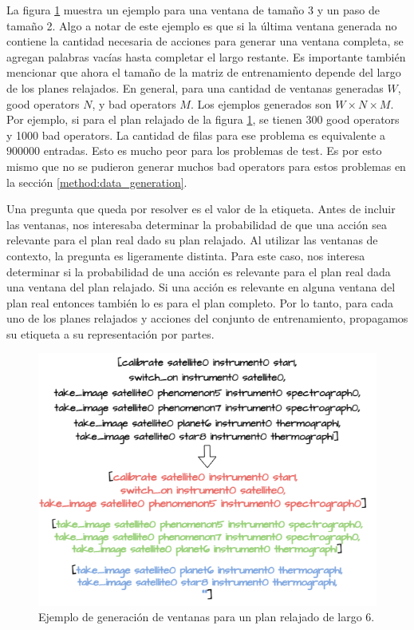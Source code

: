 La figura \ref{fig:window_example} muestra un ejemplo para una ventana de tamaño
3 y un paso de tamaño 2. Algo a notar de este ejemplo es que si la última
ventana generada no contiene la cantidad necesaria de acciones para generar una
ventana completa, se agregan palabras vacías hasta completar el largo restante.
Es importante también mencionar que ahora el tamaño de la matriz de entrenamiento
depende del largo de los planes relajados. En general, para una cantidad de
ventanas generadas $W$, good operators $N$, y bad operators $M$. Los ejemplos
generados son $W \times N \times M$. Por ejemplo, si para el plan relajado de la
figura \ref{fig:window_example}, se tienen 300 good operators y 1000 bad
operators. La cantidad de filas para ese problema es equivalente a $900000$
entradas. Esto es mucho peor para los problemas de test. Es por esto mismo que
no se pudieron generar muchos bad operators para estos problemas en la sección
\ref{method:data_generation}.

Una pregunta que queda por resolver es el valor de la etiqueta. Antes de incluir
las ventanas, nos interesaba determinar la probabilidad de que una acción sea
relevante para el plan real dado su plan relajado. Al utilizar las ventanas de
contexto, la pregunta es ligeramente distinta. Para este caso, nos interesa
determinar si la probabilidad de una acción es relevante para el plan real dada
una ventana del plan relajado. Si una acción es relevante en alguna ventana del
plan real entonces también lo es para el plan completo. Por lo tanto, para cada
uno de los planes relajados y acciones del conjunto de entrenamiento, propagamos
su etiqueta a su representación por partes.

\begin{figure}[t!]
    \centering
    \includegraphics[width=\linewidth]{figures/window_example.png}
    \caption{Ejemplo de generación de ventanas para un plan relajado de largo 6.}
    \label{fig:window_example}
\end{figure}

